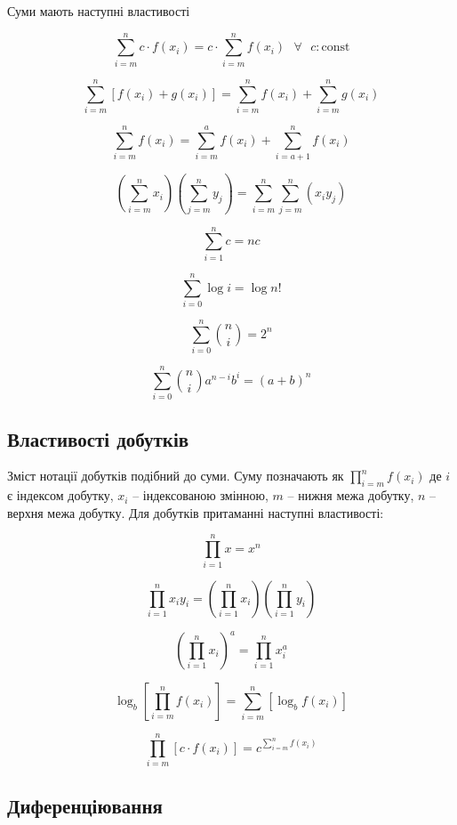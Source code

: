 \documentclass[
  11pt,
]{book}
\begin{document}
Суми мають наступні властивості

\[\sum\limits_{i=m}^{n}c\cdot f(x_i) = c \cdot \sum\limits_{i=m}^{n} f(x_i) \text{ } \forall \text{ } c : \text{const}\]

\[\sum\limits_{i=m}^{n} \left[ f(x_i) + g(x_i)\right] = \sum\limits_{i=m}^{n} f(x_i) + \sum\limits_{i=m}^{n} g(x_i)\]

\[\sum\limits_{i=m}^{n} f(x_i) = \sum\limits_{i=m}^{a} f(x_i) + \sum\limits_{i=a+1}^{n} f(x_i)\]

\[\left( \sum\limits_{i = m}^n x_i \right)\left( \sum\limits_{j = m}^n y_j \right) = \sum\limits_{i = m}^n \sum\limits_{j = m}^n (x_i y_j)\]

\[\sum \limits_{i=1}^n c = nc\]

\[\sum \limits_{i=0}^n \log i = \log n!\]

\[\sum \limits_{i=0}^n \binom{n}{i} = 2^n\]

\[\sum \limits_{i=0}^n \binom{n}{i} a^{n-i} b^i = (a+b)^n\]

\subsection{Властивості добутків}\label{ux432ux43bux430ux441ux442ux438ux432ux43eux441ux442ux456-ux434ux43eux431ux443ux442ux43aux456ux432}

Зміст нотації добутків подібний до суми. Суму позначають як \(\prod\limits_{i=m}^{n}f(x_i)\) де \(i\) є індексом добутку, \(x_i\) -- індексованою змінною, \(m\) -- нижня межа добутку, \(n\) -- верхня межа добутку. Для добутків притаманні наступні властивості:

\[\prod\limits_{i=1}^n x = x^n\]

\[\prod\limits_{i=1}^n x_i y_i = \left( \prod\limits_{i=1}^n x_i\right)\left( \prod\limits_{i=1}^n y_i\right)\]

\[\left( \prod\limits_{i=1}^n x_i \right)^a = \prod\limits_{i=1}^n x_i^a\]

\[\log_b \left[ \prod\limits_{i = m}^n f(x_i) \right] = \sum\limits_{i=m}^n \left[ \log_b f(x_i) \right]\]

\[\prod\limits_{i = m}^n [c \cdot f(x_i)] = c^{\sum_{i=m}^n f(x_i)}\]

\subsection{Диференціювання}\label{ux434ux438ux444ux435ux440ux435ux43dux446ux456ux44eux432ux430ux43dux43dux44f}
\end{document}
